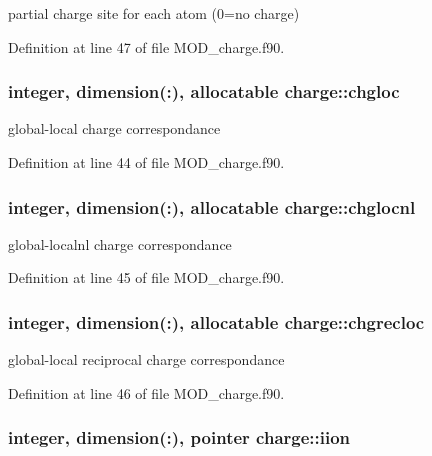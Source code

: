 partial charge site for each atom (0=no charge) 



Definition at line 47 of file M\-O\-D\-\_\-charge.\-f90.

\hypertarget{classcharge_a45283ea4c54a0b8599a90c578a64c52d}{
\subsubsection[{chgloc}]{\setlength{\rightskip}{0pt plus 5cm}integer, dimension(\-:), allocatable charge\-::chgloc}}\label{classcharge_a45283ea4c54a0b8599a90c578a64c52d}


global-\/local charge correspondance 



Definition at line 44 of file M\-O\-D\-\_\-charge.\-f90.

\hypertarget{classcharge_a169a510a227dd75073a027063bb6557f}{
\subsubsection[{chglocnl}]{\setlength{\rightskip}{0pt plus 5cm}integer, dimension(\-:), allocatable charge\-::chglocnl}}\label{classcharge_a169a510a227dd75073a027063bb6557f}


global-\/localnl charge correspondance 



Definition at line 45 of file M\-O\-D\-\_\-charge.\-f90.

\hypertarget{classcharge_a8a9599984bf2ac50e7cdd59700c7524e}{
\subsubsection[{chgrecloc}]{\setlength{\rightskip}{0pt plus 5cm}integer, dimension(\-:), allocatable charge\-::chgrecloc}}\label{classcharge_a8a9599984bf2ac50e7cdd59700c7524e}


global-\/local reciprocal charge correspondance 



Definition at line 46 of file M\-O\-D\-\_\-charge.\-f90.

\hypertarget{classcharge_ab3b8a9ef8a12e1eaff80d57d1d026aa4}{
\subsubsection[{iion}]{\setlength{\rightskip}{0pt plus 5cm}integer, dimension(\-:), pointer charge\-::iion}}\label{classcharge_ab3b8a9ef8a12e1eaff80d57d1d026aa4}


